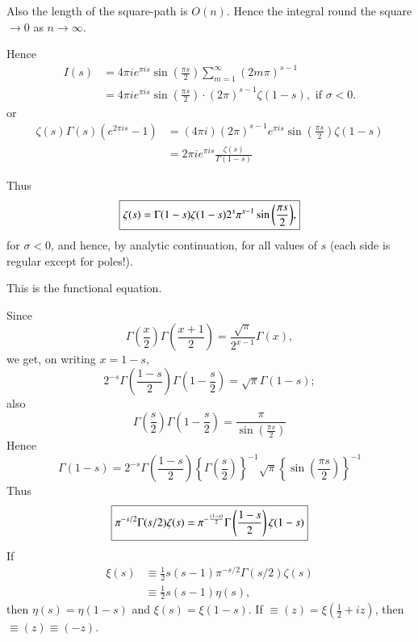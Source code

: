Also the length of the square-path is $O(n)$. Hence the integral round
the square $\to 0$ as $n \to \infty$.

Hence
\begin{align*}
I(s) & = 4 \pi i e^{\pi i s} \sin\left(\frac{\pi s}{2}\right)
\sum\limits^\infty_{m=1} (2m \pi)^{s-1}\\
& = 4 \pi i e^{\pi i s} \sin \left(\frac{\pi s}{2}\right) \cdot (2\pi)^{s-1} \zeta
(1-s), \text{ if } \sigma < 0. 
\end{align*}
or\pageoriginale
\begin{align*}
\zeta(s) \Gamma (s) (e^{2\pi is}-1) & = (4\pi i) (2\pi)^{s-1} e^{\pi i
s} \sin \left(\frac{\pi s}{2}\right) \zeta(1-s)\\
& = 2 \pi i e^{\pi i s} \frac{\zeta(s)}{\Gamma(1-s)}
\end{align*}

Thus
$$
\text{\fbox{$\zeta(s) = \Gamma (1-s) \zeta(1-s) 2^s \pi^{s-1}
    \sin\left(\dfrac{\pi s}{2}\right)$,}}
$$
for $\sigma < 0$, and hence, by analytic continuation, for all values
of $s$ (each side is regular except for poles!).

This is the functional equation.

Since
$$
\Gamma \left(\frac{x}{2} \right) \Gamma \left(\frac{x+1}{2} \right) =
\frac{\sqrt{\pi}}{2^{x-1}} \Gamma(x),
$$
we get, on writing $x=1-s$, 
$$
2^{-s} \Gamma \left( \frac{1-s}{2}\right) \Gamma \left(1-\frac{s}{2}
\right) = \sqrt{\pi} \Gamma (1-s);
$$
also 
$$
\Gamma \left(\frac{s}{2} \right) \Gamma \left(1-\frac{s}{2} \right) =
\frac{\pi}{\sin \left(\frac{\pi s}{2}\right)} 
$$
Hence
$$
\Gamma(1-s) = 2^{-s} \Gamma \left(\frac{1-s}{2} \right) \left\{\Gamma
\left(\frac{s}{2} \right) \right\}^{-1} \sqrt{\pi} \left\{\sin\left(\frac{\pi
  s}{2}\right)\right\}^{-1} 
$$
Thus
$$
\text{\fbox{$\pi^{-s/2} \Gamma(s/2) \zeta(s) = \pi^{-\frac{(1-s)}{2}}
\Gamma \left(\dfrac{1-s}{2} \right)\zeta(1-s) $}} 
$$
If\pageoriginale
\begin{align*}
\xi (s) & \equiv \frac{1}{2} s(s-1) \pi^{-s/2} \Gamma(s/2) \zeta(s)\\
& \equiv \frac{1}{2} s(s-1) \eta(s),
\end{align*}
then $\eta(s) = \eta(1-s)$ and $\xi (s) = \xi (1-s)$. If $\equiv (z) =
\xi \left(\frac{1}{2} + iz\right)$, then $\equiv (z) \equiv (-z)$.


